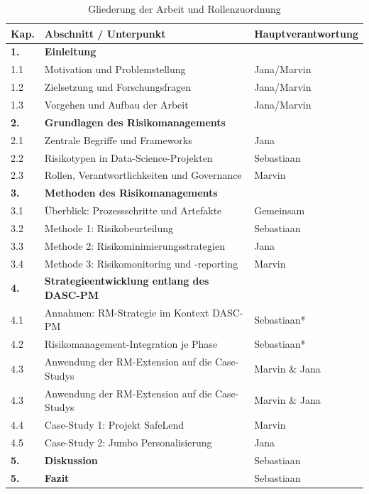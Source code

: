 \begin{table}[H]
\centering
\caption{Gliederung der Arbeit und Rollenzuordnung}
\label{tab:projektorganisation}
\begin{tabular}{|p{1.5cm}|p{7.5cm}|p{5cm}|}
\hline
\textbf{Kap.} & \textbf{Abschnitt / Unterpunkt} & \textbf{Hauptverantwortung} \\ \hline
\textbf{1.} & \textbf{Einleitung} & \\ \hline
1.1 & Motivation und Problemstellung & Jana/Marvin \\ \hline
1.2 & Zielsetzung und Forschungsfragen & Jana/Marvin \\ \hline
1.3 & Vorgehen und Aufbau der Arbeit & Jana/Marvin \\ \hline
\textbf{2.} & \textbf{Grundlagen des Risikomanagements} & \\ \hline
2.1 & Zentrale Begriffe und Frameworks & Jana \\ \hline
2.2 & Risikotypen in Data-Science-Projekten & Sebastiaan \\ \hline
2.3 & Rollen, Verantwortlichkeiten und Governance & Marvin \\ \hline
\textbf{3.} & \textbf{Methoden des Risikomanagements} & \\ \hline
3.1 & Überblick: Prozessschritte und Artefakte & Gemeinsam \\ \hline
3.2 & Methode 1: Risikobeurteilung & Sebastiaan \\ \hline
3.3 & Methode 2: Risikominimierungsstrategien & Jana \\ \hline
3.4 & Methode 3: Risikomonitoring und -reporting & Marvin \\ \hline
\textbf{4.} & \textbf{Strategieentwicklung entlang des DASC-PM} & \\ \hline
4.1 & Annahmen: RM-Strategie im Kontext DASC-PM & Sebastiaan* \\ \hline
4.2 & Risikomanagement-Integration je Phase & Sebastiaan* \\ \hline
        4.3 & Anwendung der RM-Extension auf die Case-Studys & Marvin \& Jana \\ \hline
4.3 & Anwendung der RM-Extension auf die Case-Studys & Marvin \& Jana \\ \hline
4.4 & Case-Study 1: Projekt SafeLend & Marvin \\ \hline
4.5 & Case-Study 2: Jumbo Personalisierung & Jana \\ \hline
        \textbf{5.} & \textbf{Diskussion} & Sebastiaan \\ \hline
\textbf{5.} & \textbf{Fazit} & Sebastiaan \\ \hline

\end{tabular}
\end{table}

